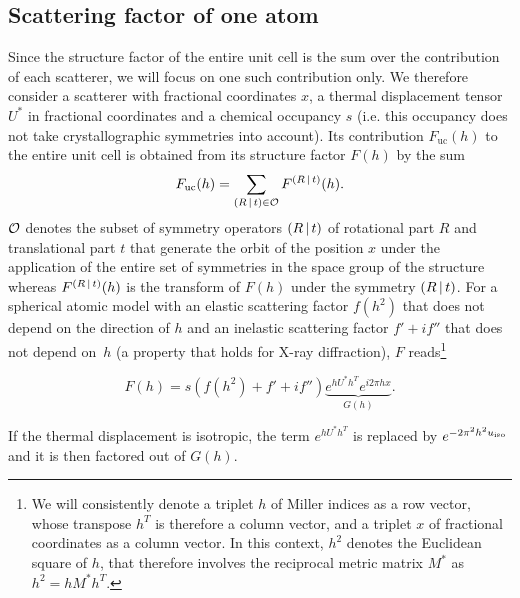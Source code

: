 \documentclass[pdf]{iucr}
\begin{document}
\subsection{Scattering factor of one atom}

\newcommand{\Fuc}{F_{\text{uc}}}

Since the structure factor of the entire unit cell is the sum over the contribution of each scatterer, we will focus on one such contribution only. We therefore consider a scatterer with  fractional coordinates $x$, a thermal displacement tensor $U^*$ in fractional coordinates and a chemical occupancy $s$ (i.e. this occupancy does not take crystallographic symmetries into account).  Its contribution $\Fuc(h)$ to the entire unit cell is obtained from its  structure factor $F(h)$  by the sum
\begin{equation}
\Fuc(h) = \sum_{\sym{R}{t} \in \cal{O}} F^{\sym{R}{t}}(h).
\end{equation}
$\cal{O}$ denotes the subset of symmetry operators $\left( R\,\vert\, t \right)$ of rotational part $R$ and translational part $t$ that generate the orbit of the position $x$ under the application of the entire set of symmetries in the space group of the structure whereas $F^{\left( R\,\vert\, t \right)}(h)$ is the transform of $F(h)$ under the symmetry $\left( R\,\vert\, t \right)$. For a spherical atomic model with an elastic scattering factor $f(h^2)$ that does not depend on the direction of $h$ and an inelastic scattering factor $f' + if''$ that does not depend on~$h$ (a property that holds for X-ray diffraction), $F$ reads\footnote{We will consistently denote a triplet $h$ of Miller indices as a row vector, whose transpose $h^T$ is therefore a column vector, and a triplet $x$ of fractional coordinates as a column vector. In this context, $h^2$ denotes the Euclidean square of $h$, that therefore involves the reciprocal metric matrix $M^*$ as $h^2 = h M^* h^T$.}

\begin{equation}
F(h) = s (f(h^2) + f' + i f'') \underbrace{e^{h U^* h^T} e^{i 2\pi h x}}_{G(h)}.
\end{equation}

If the thermal displacement is isotropic, the term $e^{h U^* h^T}$ is replaced by $e^{-2\pi^2 h^2 u_{\text{iso}}}$ and it is then factored out of $G(h)$.
\end{document}
